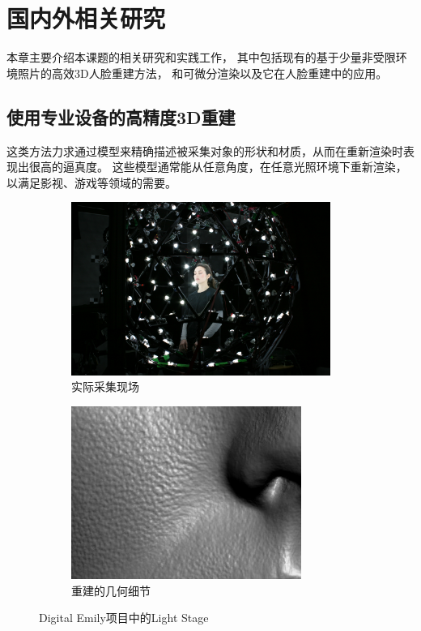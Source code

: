 \chapter{国内外相关研究}
\label{chap:related_work}

本章主要介绍本课题的相关研究和实践工作，
其中包括现有的基于少量非受限环境照片的高效3D人脸重建方法，
和可微分渲染以及它在人脸重建中的应用。

\section{使用专业设备的高精度3D重建}

这类方法力求通过模型来精确描述被采集对象的形状和材质，从而在重新渲染时表现出很高的逼真度。
这些模型通常能从任意角度，在任意光照环境下重新渲染，以满足影视、游戏等领域的需要。

\begin{figure}
\centering
\begin{subfigure}[b]{0.53\textwidth}
    \centering
    \includegraphics[height=160pt]{figures/light_stage}
    \caption{实际采集现场}
\end{subfigure}%
\begin{subfigure}[b]{0.47\textwidth}
    \centering
    \includegraphics[height=160pt]{figures/emily_detail_1}
    \caption{重建的几何细节}
\end{subfigure}
\caption[Digital Emily 项目中的 Light Stage]{Digital Emily项目中的Light Stage\cite{DEP}}
\end{figure}

